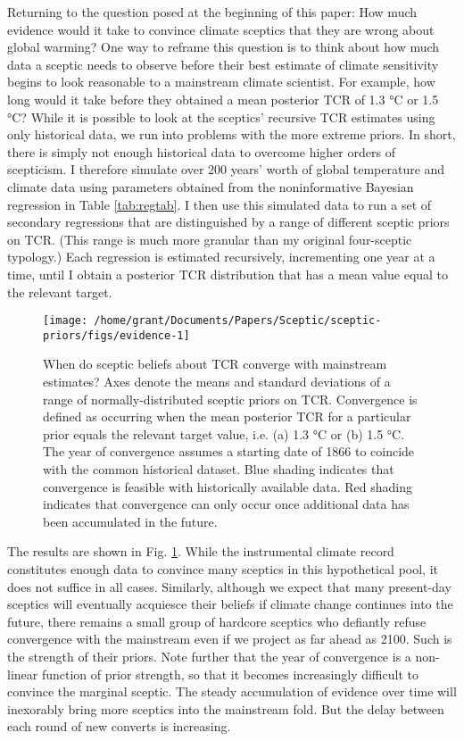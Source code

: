 \documentclass[smallextended]{svjour3}       %
\begin{document}
Returning to the question posed at the beginning of this paper: How much
evidence would it take to convince climate sceptics that they are wrong
about global warming? One way to reframe this question is to think about
how much data a sceptic needs to observe before their best estimate of
climate sensitivity begins to look reasonable to a mainstream climate
scientist. For example, how long would it take before they obtained a
mean posterior TCR of 1.3 °C or 1.5 °C? While it is possible to look at
the sceptics' recursive TCR estimates using only historical data, we run
into problems with the more extreme priors. In short, there is simply
not enough historical data to overcome higher orders of scepticism. I
therefore simulate over 200 years' worth of global temperature and
climate data using parameters obtained from the noninformative Bayesian
regression in Table \ref{tab:regtab}. I then use this simulated data to
run a set of secondary regressions that are distinguished by a range of
different sceptic priors on TCR. (This range is much more granular than
my original four-sceptic typology.) Each regression is estimated
recursively, incrementing one year at a time, until I obtain a posterior
TCR distribution that has a mean value equal to the relevant target.

\begin{figure}

{\centering \texttt{[image: /home/grant/Documents/Papers/Sceptic/sceptic-priors/figs/evidence-1]} 

}

\caption{When do sceptic beliefs about TCR converge with mainstream estimates? Axes denote the means and standard deviations of a range of normally-distributed sceptic priors on TCR. Convergence is defined as occurring when the mean posterior TCR for a particular prior equals the relevant target value, i.e. (a) 1.3 °C or (b) 1.5 °C. The year of convergence assumes a starting date of 1866 to coincide with the common historical dataset. Blue shading indicates that convergence is feasible with historically available data. Red shading indicates that convergence can only occur once additional data has been accumulated in the future.}\label{fig:evidence}
\end{figure}

The results are shown in Fig. \ref{fig:evidence}. While the instrumental
climate record constitutes enough data to convince many sceptics in this
hypothetical pool, it does not suffice in all cases. Similarly, although
we expect that many present-day sceptics will eventually acquiesce their
beliefs if climate change continues into the future, there remains a
small group of hardcore sceptics who defiantly refuse convergence with
the mainstream even if we project as far ahead as 2100. Such is the
strength of their priors. Note further that the year of convergence is a
non-linear function of prior strength, so that it becomes increasingly
difficult to convince the marginal sceptic. The steady accumulation of
evidence over time will inexorably bring more sceptics into the
mainstream fold. But the delay between each round of new converts is
increasing.
\end{document}
